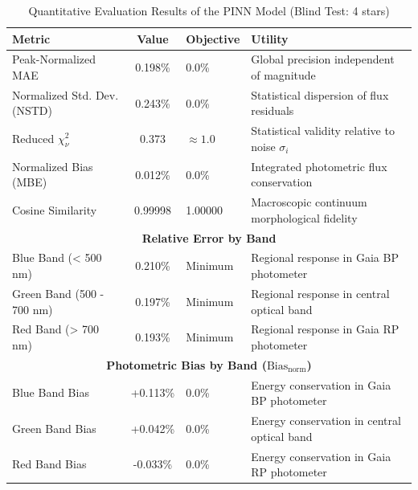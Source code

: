 
\begin{table}[htpb]
\centering
\caption{Quantitative Evaluation Results of the PINN Model (Blind Test: 4 stars)}
\label{tab:pinn_evaluation}
\begin{tabular}{lcll}
\hline
\textbf{Metric} & \textbf{Value} & \textbf{Objective} & \textbf{Utility} \\
\hline
Peak-Normalized MAE & 0.198\% & 0.0\% & Global precision independent of magnitude \\
Normalized Std. Dev. (NSTD) & 0.243\% & 0.0\% & Statistical dispersion of flux residuals \\
Reduced $\chi^2_\nu$ & 0.373 & $\approx 1.0$ & Statistical validity relative to noise $\sigma_i$ \\
Normalized Bias (MBE) & 0.012\% & 0.0\% & Integrated photometric flux conservation \\
Cosine Similarity & 0.99998 & 1.00000 & Macroscopic continuum morphological fidelity \\
\hline
\multicolumn{4}{c}{\textbf{Relative Error by Band}} \\
\hline
Blue Band (< 500 nm) & 0.210\% & Minimum & Regional response in Gaia BP photometer \\
Green Band (500 - 700 nm) & 0.197\% & Minimum & Regional response in central optical band \\
Red Band (> 700 nm) & 0.193\% & Minimum & Regional response in Gaia RP photometer \\
\hline
\multicolumn{4}{c}{\textbf{Photometric Bias by Band ($\text{Bias}_{\text{norm}}$)}} \\
\hline
Blue Band Bias & +0.113\% & 0.0\% & Energy conservation in Gaia BP photometer \\
Green Band Bias & +0.042\% & 0.0\% & Energy conservation in central optical band \\
Red Band Bias & -0.033\% & 0.0\% & Energy conservation in Gaia RP photometer \\
\hline
\end{tabular}
\end{table}
